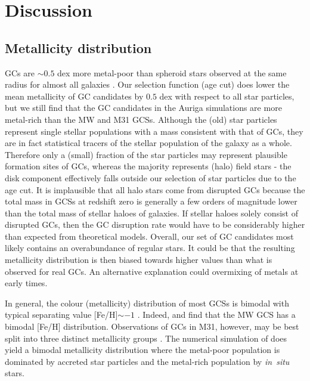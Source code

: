 \documentclass[a4paper,fleqn,usenatbib]{mnras}
\begin{document}
\section{Discussion}
\label{sec:discussion}
\subsection{Metallicity distribution}
\label{sec:discussion_FeH}
GCs are ${\sim}0.5$ dex more metal-poor than spheroid stars observed 
at the same radius for almost all galaxies \citep{1991ARA&A..29..543H}. Our 
selection function (age cut) does lower the mean metallicity of GC candidates by 
$0.5$ dex with respect to all star particles, but we still find that the GC 
candidates in the Auriga simulations are more metal-rich than the MW and M31 GCSs. 
Although the (old) star particles represent single stellar populations with a mass 
consistent with that of GCs, they are in fact statistical tracers 
of the stellar population of the galaxy as a whole. Therefore only a (small) 
fraction of the star particles may represent plausible formation sites of GCs, 
whereas the majority represents (halo) field stars - the disk component effectively 
falls outside our selection of star particles due to the age cut. It is implausible 
that all halo stars come from disrupted GCs because the total mass in GCSs 
at redshift zero is generally a few orders of magnitude lower than the total 
mass of stellar haloes of galaxies. If stellar haloes solely consist of disrupted
GCs, then the GC disruption rate would have to be considerably higher than expected
from theoretical models. Overall, our set of GC candidates most likely contains
an overabundance of regular stars. It could be that the resulting metallicity
distribution is then biased towards higher values than what is observed for real 
GCs. An alternative explanation could overmixing of metals at early times.


In general, the colour (metallicity) distribution of most GCSs is bimodal 
with typical separating value [Fe/H]$\sim -1$ \citep{1985ApJ...293..424Z,
1999AJ....118.1526G,2001AJ....121.2974L,2006ApJ...639...95P}. Indeed, 
\citet{1998gcs..book.....A} and \citet{Harris2001} find that the MW GCS has a 
bimodal [Fe/H] distribution. Observations of GCs in M31, however, may be best 
split into three distinct metallicity groups \citep{2016ApJ...824...42C}. The 
numerical simulation of \citet{2017MNRAS.465.3622R} does yield a bimodal 
metallicity distribution where the metal-poor population is dominated by accreted 
star particles and the metal-rich population by {\it in~situ} stars. 
\end{document}
